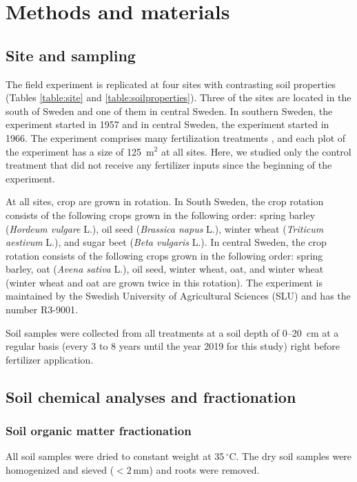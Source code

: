 \documentclass[bg, manuscript]{copernicus}
\begin{document}
\section{Methods and materials}

\subsection{Site and sampling}
The field experiment is replicated at four sites with contrasting soil properties (Tables \ref{table:site} and \ref{table:soilproperties}). Three of the sites are located in the south of Sweden and one of them in central Sweden. In southern Sweden, the experiment started in 1957 and in central Sweden, the experiment started in 1966. The experiment comprises many fertilization treatments \citep{Carlgren2001}, and each plot of the experiment has a size of 125~$\text{m}^2$ at all sites. Here, we studied only the control treatment that did not receive any fertilizer inputs since the beginning of the experiment.

At all sites, crop are grown in rotation. In South Sweden, the crop rotation consists of the following crops grown in the following order: spring barley (\textit{Hordeum vulgare} L.), oil seed (\textit{Brassica napus} L.), winter wheat (\textit{Triticum aestivum} L.), and sugar beet (\textit{Beta vulgaris} L.). In central Sweden, the crop rotation consists of the following crops grown in the following order: spring barley, oat (\textit{Avena sativa} L.), oil seed, winter wheat, oat, and winter wheat (winter wheat and oat are grown twice in this rotation). The experiment is maintained by the Swedish University of Agricultural Sciences (SLU) and has the number R3-9001.

Soil samples were collected from all treatments at a soil depth of 0--20~cm at a regular basis (every 3 to 8 years until the year 2019 for this study) right before fertilizer application.

\subsection{Soil chemical analyses and fractionation}

\subsubsection{Soil organic matter fractionation}
All soil samples were dried to constant weight at 35\,$^\circ\text{C}$. The dry soil samples were homogenized and sieved ($< 2$\,mm) and roots were removed.
\end{document}
